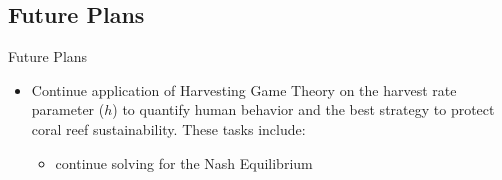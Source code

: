 \documentclass{beamer}
\begin{document}
\subsection{Future Plans}
\begin{frame}{Future Plans}
    \begin{itemize}
        \item Continue application of Harvesting Game Theory on the harvest rate parameter ($h$) to quantify human behavior and the best strategy to protect coral reef sustainability. These tasks include:
        \begin{itemize}
            \item continue solving for the Nash Equilibrium %
        \end{itemize}
    \end{itemize}
\end{frame}



\end{document}

